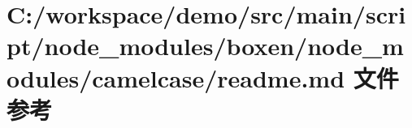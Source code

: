 \hypertarget{node__modules_2boxen_2node__modules_2camelcase_2_r_e_a_d_m_e_8md}{}\section{C\+:/workspace/demo/src/main/script/node\+\_\+modules/boxen/node\+\_\+modules/camelcase/readme.md 文件参考}
\label{node__modules_2boxen_2node__modules_2camelcase_2_r_e_a_d_m_e_8md}
